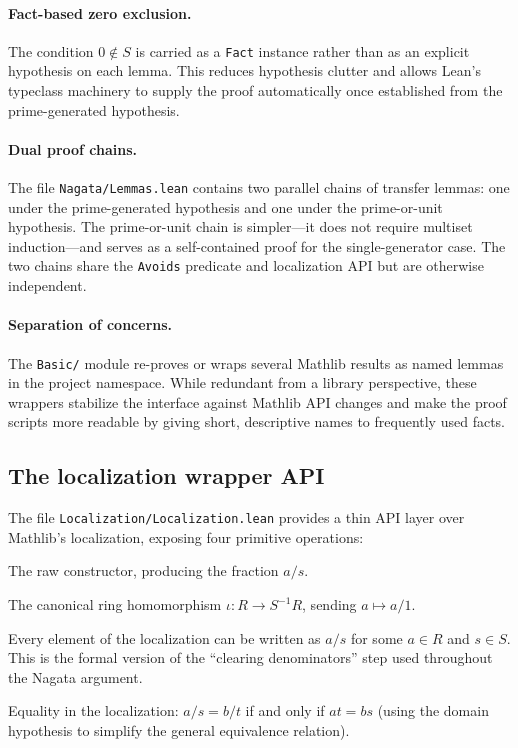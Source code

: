 \documentclass[11pt]{article}
\theoremstyle{plain}
\theoremstyle{definition}
\theoremstyle{remark}
\newcommand{\li}[1]{\texorpdfstring{\texttt{#1}}{#1}}
\newcommand{\lf}[1]{\texorpdfstring{\nolinkurl{#1}}{#1}}
\begin{document}
\paragraph{Fact-based zero exclusion.}
The condition $0\notin S$ is carried as a \li{Fact} instance rather than as an
explicit hypothesis on each lemma.  This reduces hypothesis clutter and allows
Lean's typeclass machinery to supply the proof automatically once established
from the prime-generated hypothesis.

\paragraph{Dual proof chains.}
The file \lf{Nagata/Lemmas.lean} contains two parallel chains of transfer
lemmas: one under the prime-generated hypothesis and one under the
prime-or-unit hypothesis.  The prime-or-unit chain is simpler---it does not
require multiset induction---and serves as a self-contained proof for the
single-generator case.  The two chains share the \li{Avoids} predicate and
localization API but are otherwise independent.

\paragraph{Separation of concerns.}
The \texttt{Basic/} module re-proves or wraps several Mathlib results as named
lemmas in the project namespace.  While redundant from a library perspective,
these wrappers stabilize the interface against Mathlib API changes and make the
proof scripts more readable by giving short, descriptive names to frequently
used facts.

\subsection{The localization wrapper API}\label{sec:loc-api}

The file \lf{Localization/Localization.lean} provides a thin API layer over
Mathlib's localization, exposing four primitive operations:
\begin{description}[nosep,leftmargin=1em,style=nextline]
\item[\texttt{Localization.mk\,(a : R)\,(s : S)}.]
  The raw constructor, producing the fraction $a/s$.
\item[\texttt{Localization.of\,(a : R)}.]
  The canonical ring homomorphism $\iota\colon R\to S^{-1}R$, sending
  $a\mapsto a/1$.
\item[\texttt{Localization.surj\,(z : $S^{-1}R$)}.]
  Every element of the localization can be written as $a/s$ for some $a\in R$
  and $s\in S$.  This is the formal version of the ``clearing denominators''
  step used throughout the Nagata argument.
\item[\texttt{Localization.mk\_eq\_iff}.]
  Equality in the localization: $a/s = b/t$ if and only if $at = bs$ (using
  the domain hypothesis to simplify the general equivalence relation).
\end{description}
\end{document}
